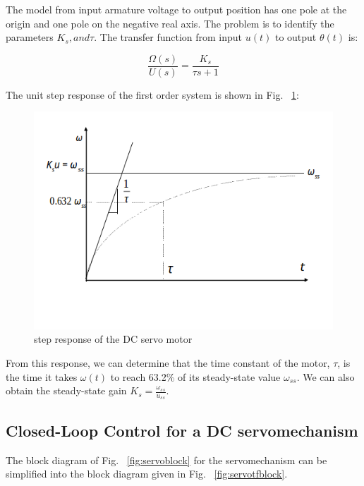 \documentclass[11pt,a4paper]{article}
\begin{document}
The model from input armature voltage to output position has one pole at the origin and one pole on the negative real axis. The problem is to identify the parameters $K_{s},and \tau$. The transfer function from input $u(t)$ to output $\theta(t)$ is:

\begin{equation} \label{eq:11}
\frac{\Omega(s)}{U(s)} = \frac{K_{s}}{\tau s + 1}
\end{equation}

The unit step response of the first order system is shown in Fig. ~\ref{fig:servostepresp}:

\begin{figure}[here]
\includegraphics[width=\textwidth]{imglab/servostepresponse.png}
\caption{step response of the DC servo motor}
\label{fig:servostepresp}
\end{figure}

From this response, we can determine that the time constant of the motor, $\tau$, is the time it takes $\omega(t)$ to reach 63.2\% of its steady-state value $\omega_{ss}$. We can also obtain the steady-state gain $K_{s} = \frac{\omega_{ss}}{u_{ss}}$.

\subsection{Closed-Loop Control for a DC servomechanism} \label{ss:closedloop}
The block diagram of Fig. ~\ref{fig:servoblock} for the servomechanism can be simplified into the block diagram given in Fig. ~\ref{fig:servotfblock}.
\end{document}
